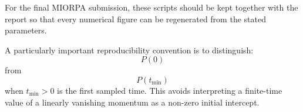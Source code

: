 \documentclass[11pt,a4paper]{article}
\theoremstyle{plain}
\theoremstyle{definition}
\theoremstyle{remark}
\begin{document}
For the final MIORPA submission, these scripts should be kept together with the report so that every numerical figure can be regenerated from the stated parameters.

A particularly important reproducibility convention is to distinguish:
\begin{equation*}
P(0)
\end{equation*}
from
\begin{equation*}
P(t_{\min})
\end{equation*}
when $t_{\min}>0$ is the first sampled time. This avoids interpreting a finite-time value of a linearly vanishing momentum as a non-zero initial intercept.



\end{document}
